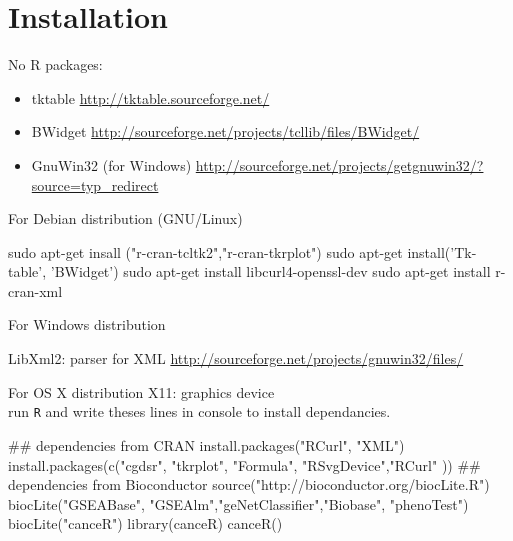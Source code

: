 \documentclass[a4paper]{article}
\begin{document}



\section{Installation}
No R packages: 
\begin{itemize}
\item tktable \url{http://tktable.sourceforge.net/}
\item BWidget \url{http://sourceforge.net/projects/tcllib/files/BWidget/}
\item GnuWin32 (for Windows)  \url{http://sourceforge.net/projects/getgnuwin32/?source=typ_redirect}

\end{itemize}

For Debian distribution (GNU/Linux)
\begin{Schunk}
\begin{Sinput}
sudo apt-get insall ("r-cran-tcltk2","r-cran-tkrplot")
sudo apt-get install('Tk-table', 'BWidget')
sudo apt-get install libcurl4-openssl-dev
sudo apt-get install  r-cran-xml
\end{Sinput}
\end{Schunk}

For Windows distribution

LibXml2: parser for XML \url{http://sourceforge.net/projects/gnuwin32/files/}


For OS X distribution
X11: graphics device
\\
run \texttt{R} and write theses lines in console to install dependancies.
\begin{Schunk}
\begin{Sinput}
## dependencies from CRAN
install.packages("RCurl", "XML")
install.packages(c("cgdsr",  "tkrplot",  "Formula", "RSvgDevice","RCurl" ))
## dependencies from Bioconductor 
source("http://bioconductor.org/biocLite.R")
biocLite("GSEABase", "GSEAlm","geNetClassifier","Biobase", "phenoTest") 
biocLite("canceR")
library(canceR)
canceR()
\end{Sinput}
\end{Schunk}
\end{document}
